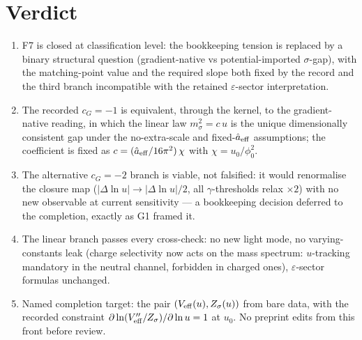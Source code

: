\documentclass[11pt,a4paper]{article}
\begin{document}
\section{Verdict}
\begin{enumerate}[leftmargin=1.9em,itemsep=2pt,label=\textbf{V\arabic*.}]
\item F7 is closed at classification level: the bookkeeping tension is
replaced by a binary structural question (gradient-native vs
potential-imported $\sigma$-gap), with the matching-point value and the
required slope both fixed by the record and the third branch incompatible
with the retained $\varepsilon$-sector interpretation.
\item The recorded $c_G=-1$ is equivalent, through the kernel, to the
gradient-native reading, in which the linear law $m_\sigma^2=c\,u$ is the
unique dimensionally consistent gap under the no-extra-scale and
fixed-$\hat a_{\rm eff}$ assumptions; the coefficient is fixed as
$c=(\hat a_{\rm eff}/16\pi^2)\,\chi$ with $\chi=u_0/\phi_0^2$.
\item The alternative $c_G=-2$ branch is viable, not falsified: it would
renormalise the closure map ($|\Delta\ln u|\to|\Delta\ln u|/2$, all
$\gamma$-thresholds relax $\times2$) with no new observable at current
sensitivity --- a bookkeeping decision deferred to the completion, exactly as
G1 framed it.
\item The linear branch passes every cross-check: no new light mode, no
varying-constants leak (charge selectivity now acts on the mass spectrum:
$u$-tracking mandatory in the neutral channel, forbidden in charged ones),
$\varepsilon$-sector formulas unchanged.
\item Named completion target: the pair $(V_{\rm eff}(u),Z_\sigma(u))$ from
bare data, with the recorded constraint
$\partial\ln(V''_{\rm eff}/Z_\sigma)/\partial\ln u=1$ at $u_0$. No preprint
edits from this front before review.
\end{enumerate}
\end{document}
